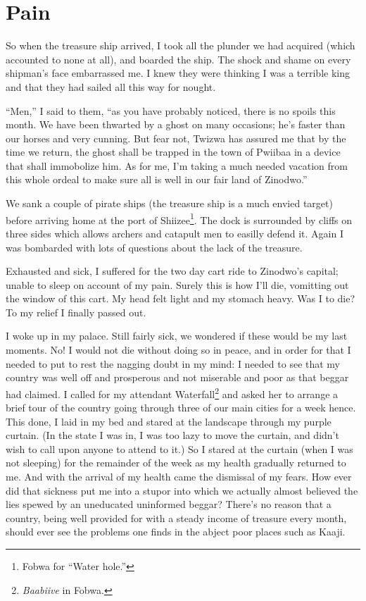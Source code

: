 \chapter{Pain}

So when the treasure ship arrived, I took all the plunder we had acquired (which accounted to none at all), and boarded the ship.
The shock and shame on every shipman's face embarrassed me. I knew they were thinking I was a terrible king and that they had sailed all this way for nought.

``Men,'' I said to them, ``as you have probably noticed, there is no spoils this month. We have been thwarted by a ghost on many occasions; he's faster than our horses and very cunning.
But fear not, Twizwa has assured me that by the time we return, the ghost shall be trapped in the town of Pwiibaa in a device that shall immobolize him.
As for me, I'm taking a much needed vacation from this whole ordeal to make sure all is well in our fair land of Zinodwo.''

We sank a couple of pirate ships (the treasure ship is a much envied target) before arriving home at the port of Shiizee\footnote{Fo\-bwa for ``Water hole.''}. The dock is surrounded by cliffs on three sides which allows archers and catapult men to easilly defend it. Again I was bombarded with lots of questions about the lack of the treasure.

Exhausted and sick, I suffered for the two day cart ride to Zinodwo's capital; unable to sleep on account of my pain. Surely this is how I'll die, vomitting out the window of this cart. My head felt light and my stomach heavy. Was I to die? To my relief I finally passed out.

I woke up in my palace. Still fairly sick, we wondered if these would be my last moments. No! I would not die without doing so in peace, and in order for that I needed to put to rest the nagging doubt in my mind: I needed to see that my country was well off and prosperous and not miserable and poor as that beggar had claimed. I called for my attendant Waterfall\footnote{\emph{Baabiive} in Fobwa.} and asked her to arrange a brief tour of the country going through three of our main cities for a week hence. This done, I laid in my bed and stared at the landscape through my purple curtain. (In the state I was in, I was too lazy to move the curtain, and didn't wish to call upon anyone to attend to it.) So I stared at the curtain (when I was not sleeping) for the remainder of the week as my health gradually returned to me. And with the arrival of my health came the dismissal of my fears. How ever did that sickness put me into a stupor into which we actually almost believed the lies spewed by an uneducated uninformed beggar? There's no reason that a country, being well provided for with a steady income of treasure every month, should ever see the problems one finds in the abject poor places such as Kaaji.


